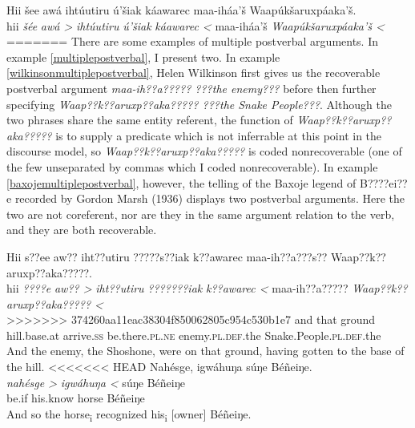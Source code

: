 \documentclass[output=paper]{LSP/langsci}
\begin{document}
\ea\label{multiplepostverbal}
\ea\label{wilkinsonmultiplepostverbal}
Hii šee awá ihtúutiru ú’šiak káawarec maa-iháa’š Waapúkšaruxpáaka’š.\footnotemark\\
\gll	hii 		\emph{šée} 		\emph{awá >}		\emph{ihtúutiru} 			\emph{ú’šiak} 		\emph{káawarec <}	maa-iháa’š 				\emph{Waapúkšaruxpáaka’š <}\\
=======
There are some examples of multiple postverbal arguments. In example \ref{multiplepostverbal}, I present two. In example \ref{wilkinsonmultiplepostverbal}, Helen Wilkinson first gives us the recoverable postverbal argument \emph{maa-ih??a????? ???the enemy???} before then further specifying \emph{Waap??k??aruxp??aka????? ???the Snake People???}. Although the two phrases share the same entity referent, the function of \emph{Waap??k??aruxp??aka?????} is to supply a predicate which is not inferrable at this point in the discourse model, so \emph{Waap??k??aruxp??aka?????} is coded nonrecoverable (one of the few unseparated by commas which I coded nonrecoverable). In example \ref{baxojemultiplepostverbal}, however, the telling of the Baxoje legend of B????ei??e recorded by Gordon Marsh (1936) displays two postverbal arguments. Here the two are not coreferent, nor are they in the same argument relation to the verb, and they are both recoverable. 

\ea\label{multiplepostverbal}
\ea\label{wilkinsonmultiplepostverbal}
Hii s??ee aw?? iht??utiru ?????s??iak k??awarec maa-ih??a???s?? Waap??k??aruxp??aka?????.\footnotemark\\
\gll	hii 		\emph{????e} 		\emph{aw?? >}		\emph{iht??utiru} 			\emph{???????iak} 		\emph{k??awarec <}	maa-ih??a????? 				\emph{Waap??k??aruxp??aka????? <}\\
>>>>>>> 374260aa11eac38304f850062805c954c530b1e7
	and 		that	 		ground 			hill.base.at	 			arrive.\textsc{ss} 		be.there.\textsc{pl.ne}	enemy.\textsc{pl.def}.the 		Snake.People.\textsc{pl.def}.the\\
\glt	And the enemy, the Shoshone, were on that ground, having gotten to the base of the hill.
\ex\label{baxojemultiplepostverbal}
<<<<<<< HEAD
Nahésge, igwáhuŋa súŋe Béñeiŋe.\footnotemark\\
\gll	\emph{nahésge >}	\emph{igwáhuŋa <}	súŋe 		Béñeiŋe\\
	be.if 			his.know 			horse 		Béñeiŋe\\
\glt	And so the horse\textsubscript{i} recognized his\textsubscript{i} [owner] Béñeiŋe.
\z\z
\end{document}
